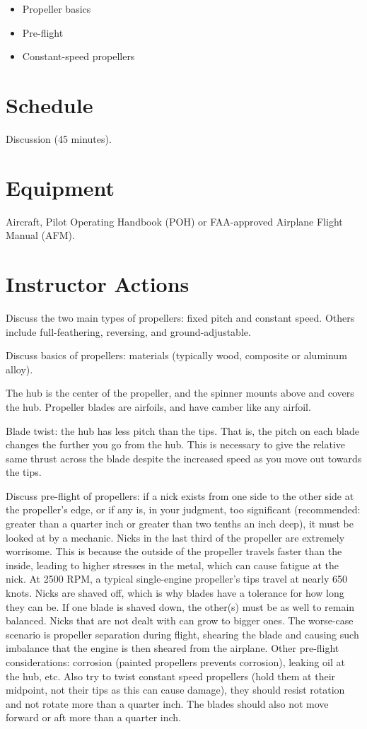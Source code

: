 \documentclass[twoside,openright]{report}
\begin{document}
\begin{itemize}
  \item Propeller basics
  \item Pre-flight
  \item Constant-speed propellers
\end{itemize}

\section{Schedule}

Discussion (45 minutes).

\section{Equipment}

Aircraft, Pilot Operating Handbook (POH) or FAA-approved Airplane Flight Manual
(AFM).

\section{Instructor Actions}

Discuss the two main types of propellers: fixed pitch and constant speed.
Others include full-feathering, reversing, and ground-adjustable.

Discuss basics of propellers: materials (typically wood, composite or aluminum
alloy).

The hub is the center of the propeller, and the spinner mounts above and covers
the hub. Propeller blades are airfoils, and have camber like any airfoil.

Blade twist: the hub has less pitch than the tips. That is, the pitch on each
blade changes the further you go from the hub. This is necessary to give the
relative same thrust across the blade despite the increased speed as you move
out towards the tips.

Discuss pre-flight of propellers: if a nick exists from one side to the other
side at the propeller's edge, or if any is, in your judgment, too significant
(recommended: greater than a quarter inch or greater than two tenths an inch
deep), it must be looked at by a mechanic. Nicks in the last third of the
propeller are extremely worrisome. This is because the outside of the propeller
travels faster than the inside, leading to higher stresses in the metal, which
can cause fatigue at the nick. At 2500 RPM, a typical single-engine
propeller’s tips travel at nearly 650 knots. Nicks are shaved off, which is
why blades have a tolerance for how long they can be. If one blade is shaved
down, the other(s) must be as well to remain balanced. Nicks that are not
dealt with can grow to bigger ones. The worse-case scenario is propeller
separation during flight, shearing the blade and causing such imbalance that
the engine is then sheared from the airplane. Other pre-flight considerations:
corrosion (painted propellers prevents corrosion), leaking oil at the hub, etc.
Also try to twist constant speed propellers (hold them at their midpoint, not
their tips as this can cause damage), they should resist rotation and not
rotate more than a quarter inch. The blades should also not move forward or aft
more than a quarter inch.
\end{document}
